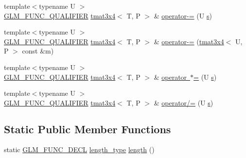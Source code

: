 \begin{DoxyCompactItemize}
\item 
{\footnotesize template$<$typename U $>$ }\\\mbox{\hyperlink{setup_8hpp_a33fdea6f91c5f834105f7415e2a64407}{G\+L\+M\+\_\+\+F\+U\+N\+C\+\_\+\+Q\+U\+A\+L\+I\+F\+I\+ER}} \mbox{\hyperlink{structglm_1_1tmat3x4}{tmat3x4}}$<$ T, P $>$ \& \mbox{\hyperlink{structglm_1_1tmat3x4_a15e2144679bbd267e558953161329d8e}{operator-\/=}} (U \mbox{\hyperlink{glad_8h_af1b1d5edfea6a34daee7389b1b5810ad}{s}})
\item 
{\footnotesize template$<$typename U $>$ }\\\mbox{\hyperlink{setup_8hpp_a33fdea6f91c5f834105f7415e2a64407}{G\+L\+M\+\_\+\+F\+U\+N\+C\+\_\+\+Q\+U\+A\+L\+I\+F\+I\+ER}} \mbox{\hyperlink{structglm_1_1tmat3x4}{tmat3x4}}$<$ T, P $>$ \& \mbox{\hyperlink{structglm_1_1tmat3x4_ad0445e23bd233b7c793c91519cf1c817}{operator-\/=}} (\mbox{\hyperlink{structglm_1_1tmat3x4}{tmat3x4}}$<$ U, P $>$ const \&m)
\item 
{\footnotesize template$<$typename U $>$ }\\\mbox{\hyperlink{setup_8hpp_a33fdea6f91c5f834105f7415e2a64407}{G\+L\+M\+\_\+\+F\+U\+N\+C\+\_\+\+Q\+U\+A\+L\+I\+F\+I\+ER}} \mbox{\hyperlink{structglm_1_1tmat3x4}{tmat3x4}}$<$ T, P $>$ \& \mbox{\hyperlink{structglm_1_1tmat3x4_aff22dc71e9b8a66a2bf44ef45be38a7b}{operator $\ast$=}} (U \mbox{\hyperlink{glad_8h_af1b1d5edfea6a34daee7389b1b5810ad}{s}})
\item 
{\footnotesize template$<$typename U $>$ }\\\mbox{\hyperlink{setup_8hpp_a33fdea6f91c5f834105f7415e2a64407}{G\+L\+M\+\_\+\+F\+U\+N\+C\+\_\+\+Q\+U\+A\+L\+I\+F\+I\+ER}} \mbox{\hyperlink{structglm_1_1tmat3x4}{tmat3x4}}$<$ T, P $>$ \& \mbox{\hyperlink{structglm_1_1tmat3x4_a2cf29af3f032cdab63648fb0d4776274}{operator/=}} (U \mbox{\hyperlink{glad_8h_af1b1d5edfea6a34daee7389b1b5810ad}{s}})
\end{DoxyCompactItemize}
\subsection*{Static Public Member Functions}
\begin{DoxyCompactItemize}
\item 
static \mbox{\hyperlink{setup_8hpp_ab2d052de21a70539923e9bcbf6e83a51}{G\+L\+M\+\_\+\+F\+U\+N\+C\+\_\+\+D\+E\+CL}} \mbox{\hyperlink{structglm_1_1tmat3x4_ab857d16b90719de3b23d4fa423d20698}{length\+\_\+type}} \mbox{\hyperlink{structglm_1_1tmat3x4_a670b84ce9f1e862e83d3ba30648f464b}{length}} ()
\end{DoxyCompactItemize}


